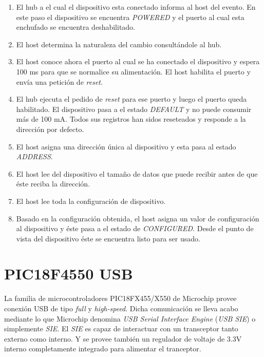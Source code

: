 \begin{enumerate}
 \item El hub a el cual el dispositivo esta conectado informa al host del
evento. En este paso el dispositivo se encuentra \emph{POWERED} y el puerto al
cual esta enchufado se encuentra deshabilitado.
 \item El host determina la naturaleza del cambio consult\'andole al hub.
 \item El host conoce ahora el puerto al cual se ha conectado el dispositivo y
espera 100 ms para que se normalice su alimentaci\'on. El host habilita el
puerto y env\'ia una petici\'on de \emph{reset}.
 \item El hub ejecuta el pedido de \emph{reset} para ese puerto y luego el
puerto queda habilitado. El dispositivo pasa a el estado \emph{DEFAULT} y no
puede consumir m\'as de 100 mA. Todos sus registros han sidos reseteados y
responde a la direcci\'on por defecto.
 \item El host asigna una direcci\'on \'unica al dispositivo y esta pasa al
estado \emph{ADDRESS}.
 \item El host lee del dispositivo el tama\~no de datos que puede recibir antes
de que \'este reciba la direcci\'on.
 \item El host lee toda la configuraci\'on de dispositivo.
 \item Basado en la configuraci\'on obtenida, el host asigna un valor de
configuraci\'on al dispositivo y \'este pasa a el estado de \emph{CONFIGURED}.
Desde el punto de vista del dispositivo \'este se encuentra listo para ser
usado.
\end{enumerate}

\newpage
\section{PIC18F4550 USB}
La familia de microcontroladores PIC18FX455/X550 de Microchip provee
conexi\'on USB de tipo \emph{full} y \emph{high-speed}. Dicha comunicaci\'on
se lleva acabo mediante lo que Microchip denomina \emph{USB Serial Interface
Engine} (\emph{USB SIE}) o simplemente \emph{SIE}. 
El \emph{SIE} es capaz de interactuar con un transceptor tanto externo como
interno. Y se provee tambi\'en un regulador de voltaje de 3.3V interno
completamente integrado para alimentar el tranceptor.

